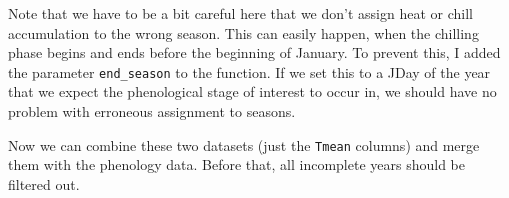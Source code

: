 \documentclass[
]{book}
\newenvironment{Shaded}{\begin{snugshade}}{\end{snugshade}}
\newcommand{\DataTypeTok}[1]{\textcolor[rgb]{0.13,0.29,0.53}{#1}}
\newcommand{\DecValTok}[1]{\textcolor[rgb]{0.00,0.00,0.81}{#1}}
\newcommand{\KeywordTok}[1]{\textcolor[rgb]{0.13,0.29,0.53}{\textbf{#1}}}
\newcommand{\NormalTok}[1]{#1}
\newcommand{\OperatorTok}[1]{\textcolor[rgb]{0.81,0.36,0.00}{\textbf{#1}}}
\newcommand{\StringTok}[1]{\textcolor[rgb]{0.31,0.60,0.02}{#1}}
\begin{document}
\begin{Shaded}
\end{Shaded}

Note that we have to be a bit careful here that we don't assign heat or chill accumulation to the wrong season. This can easily happen, when the chilling phase begins and ends before the beginning of January. To prevent this, I added the parameter \texttt{end\_season} to the function. If we set this to a JDay of the year that we expect the phenological stage of interest to occur in, we should have no problem with erroneous assignment to seasons.

Now we can combine these two datasets (just the \texttt{Tmean} columns) and merge them with the phenology data. Before that, all incomplete years should be filtered out.
\end{document}
